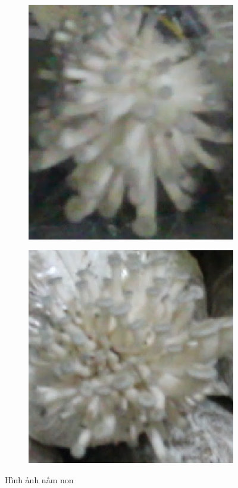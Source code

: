 \begin{figure}[H]
    \centering
        \begin{subfigure}{.5\textwidth}
        \includegraphics[width=0.8\linewidth]{images/young2.png}
    \end{subfigure}%
    \begin{subfigure}{.5\textwidth}
        \includegraphics[width=0.8\linewidth]{images/young3.png}
    \end{subfigure}
    \caption{Hình ảnh nấm non}
    \label{fig:young}
\end{figure}


